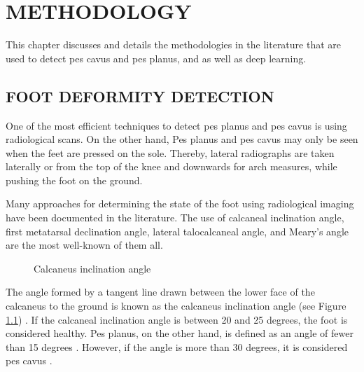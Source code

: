 \chapter{METHODOLOGY}\label{chp:Methodology}

This chapter discusses and details the methodologies in the literature that are used to detect pes cavus and pes planus, and as well as deep learning.

\section{FOOT DEFORMITY DETECTION} \label{sec:MethodologyFootDeformityDetection}

One of the most efficient techniques to detect pes planus and pes cavus is using radiological scans. On the other hand, Pes planus and pes cavus may only be seen when the feet are pressed on the sole. Thereby, lateral radiographs are taken laterally or from the top of the knee and downwards for arch measures, while pushing the foot on the ground.

Many approaches for determining the state of the foot using radiological imaging have been documented in the literature. The use of calcaneal inclination angle, first metatarsal declination angle, lateral talocalcaneal angle, and Meary's angle are the most well-known of them all.

\begin{figure}[htbp]
\centering
{}
\caption{Calcaneus inclination angle \cite{deniz2014ccocuklardaki}}
\label{fig:MethodologyCalcaneusInclinationAngle}
\end{figure}

The angle formed by a tangent line drawn between the lower face of the calcaneus to the ground is known as the calcaneus inclination angle (see Figure \ref{fig:MethodologyCalcaneusInclinationAngle}) \cite{deniz2014ccocuklardaki}. If the calcaneal inclination angle is between 20 and 25 degrees, the foot is considered healthy. Pes planus, on the other hand, is defined as an angle of fewer than 15 degrees \cite{flores2019adult}. However, if the angle is more than 30 degrees, it is considered pes cavus \cite{yates2009merriman}.

